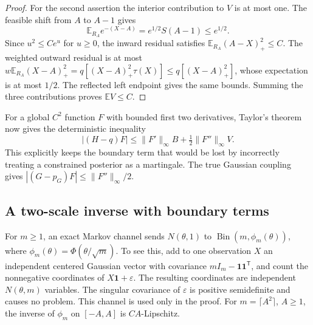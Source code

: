 \documentclass[11pt,a4paper]{article}
\theoremstyle{definition}
\theoremstyle{remark}
\numberwithin{equation}{section}
\begin{document}
\begin{proof}
For the second assertion the interior contribution to $V$ is at most
one.  The feasible shift from $A$ to $A-1$ gives
\[
 \mathbb E_{R_A}e^{-(X-A)}=e^{1/2}S(A-1)\le e^{1/2}.
\]
Since $u^2\le Ce^u$ for $u\ge0$, the inward residual satisfies
$\mathbb E_{R_A}(A-X)_+^2\le C$.
The weighted outward residual is at most
$w\mathbb E_{R_A}(X-A)_+^2=q[(X-A)_+^2\tau(X)]
\le q[(X-A)_+^2]$, whose expectation is at most $1/2$.
The reflected left endpoint gives the same bounds.  Summing the
three contributions proves $\mathbb E V\le C$.
\end{proof}

For a global $C^2$ function $F$ with bounded first two derivatives,
Taylor's theorem now gives the deterministic inequality
\begin{equation}\label{p6:gf:taylor}
 |(H-q)F|\le\|F'\|_\infty B+\tfrac12\|F''\|_\infty V.
\end{equation}
This explicitly keeps the boundary term that would be lost by
incorrectly treating a constrained posterior as a martingale.
The true Gaussian coupling gives
$|(G-p_G)F|\le\|F''\|_\infty/2$.

\subsection{A two-scale inverse with boundary terms}

For $m\ge1$, an exact Markov channel sends $N(\theta,1)$ to
$\operatorname{Bin}(m,\phi_m(\theta))$, where
$\phi_m(\theta)=\Phi(\theta/\sqrt m)$.
To see this, add to one observation $X$ an independent centered
Gaussian vector with covariance $mI_m-\mathbf1\mathbf1^{\mathsf T}$,
and count the nonnegative coordinates of $X\mathbf1+\varepsilon$.
The resulting coordinates are independent $N(\theta,m)$ variables.
The singular covariance of $\varepsilon$ is positive semidefinite
and causes no problem.  This channel is used only in the proof.
For $m=\lceil A^2\rceil$, $A\ge1$, the inverse of $\phi_m$ on
$[-A,A]$ is $CA$-Lipschitz.
\end{document}
